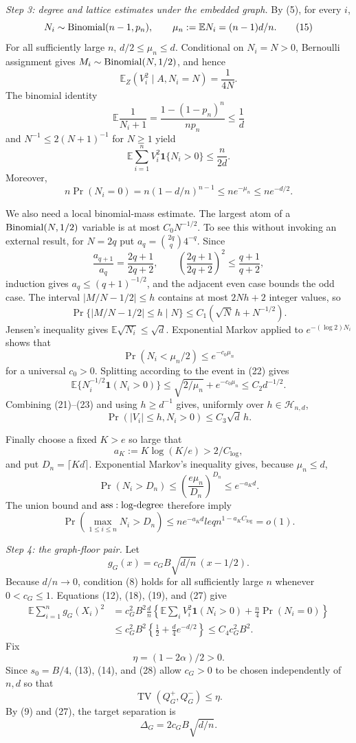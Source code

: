 \textit{Step 3: degree and lattice estimates under the embedded graph.}
By (5), for every \(i\),
\[
 N_i\sim{\rm Binomial}(n-1,p_n),
 \qquad
 \mu_n:=\mathbb EN_i=(n-1)d/n.
\tag{15}
\]
For all sufficiently large \(n\), \(d/2\leq\mu_n\leq d\).  Conditional on \(N_i=N>0\), Bernoulli assignment gives \(M_i\sim{\rm Binomial}(N,1/2)\), and hence
\[
 \mathbb E_Z(V_i^2\mid A,N_i=N)=\frac1{4N}.
\tag{16}
\]
The binomial identity
\[
 \mathbb E\frac1{N_i+1}
 =\frac{1-(1-p_n)^n}{np_n}\leq\frac1d
\tag{17}
\]
and \(N^{-1}\leq2(N+1)^{-1}\) for \(N\geq1\) yield
\[
 \mathbb E\sum_{i=1}^nV_i^2\mathbf1\{N_i>0\}
 \leq\frac{n}{2d}.
\tag{18}
\]
Moreover,
\[
 n\Pr(N_i=0)=n(1-d/n)^{n-1}
 \leq ne^{-\mu_n}\leq ne^{-d/2}.
\tag{19}
\]

We also need a local binomial-mass estimate.  The largest atom of a \({\rm Binomial}(N,1/2)\) variable is at most \(C_0N^{-1/2}\).  To see this without invoking an external result, for \(N=2q\) put \(a_q={2q\choose q}4^{-q}\).  Since
\[
 \frac{a_{q+1}}{a_q}=\frac{2q+1}{2q+2},
 \qquad
 \left(\frac{2q+1}{2q+2}\right)^2\leq\frac{q+1}{q+2},
\tag{20}
\]
induction gives \(a_q\leq(q+1)^{-1/2}\), and the adjacent even case bounds the odd case.  The interval \(|M/N-1/2|\leq h\) contains at most \(2Nh+2\) integer values, so
\[
 \Pr\{|M/N-1/2|\leq h\mid N\}
 \leq C_1(\sqrt N\,h+N^{-1/2}).
\tag{21}
\]
Jensen's inequality gives \(\mathbb E\sqrt{N_i}\leq\sqrt d\).  Exponential Markov applied to \(e^{-(\log2)N_i}\) shows that
\[
 \Pr(N_i<\mu_n/2)\leq e^{-c_0\mu_n}
\tag{22}
\]
for a universal \(c_0>0\).  Splitting according to the event in (22) gives
\[
 \mathbb E\{N_i^{-1/2}\mathbf1(N_i>0)\}
 \leq\sqrt{2/\mu_n}+e^{-c_0\mu_n}
 \leq C_2d^{-1/2}.
\tag{23}
\]
Combining (21)--(23) and using \(h\geq d^{-1}\) gives, uniformly over \(h\in\mathcal H_{n,d}\),
\[
 \Pr(|V_i|\leq h,N_i>0)\leq C_3\sqrt d\,h.
\tag{24}
\]

Finally choose a fixed \(K>e\) so large that
\[
 a_K:=K\log(K/e)>2/C_{\log},
\]
and put \(D_n=\lceil Kd\rceil\).  Exponential Markov's inequality gives, because \(\mu_n\leq d\),
\[
 \Pr(N_i>D_n)
 \leq\left(\frac{e\mu_n}{D_n}\right)^{D_n}
 \leq e^{-a_Kd}.
\tag{25}
\]
The union bound and \({\rm ass:log\text{-}degree}\) therefore imply
\[
 \Pr\left(\max_{1\leq i\leq n}N_i>D_n\right)
 \leq ne^{-a_Kd}leq n^{1-a_KC_{\log}}=o(1).
\tag{26}
\]

\textit{Step 4: the graph-floor pair.}
Let
\[
 g_G(x)=c_GB\sqrt{d/n}\,(x-1/2).
\tag{27}
\]
Because \(d/n\to0\), condition (8) holds for all sufficiently large \(n\) whenever \(0<c_G\leq1\).  Equations (12), (18), (19), and (27) give
\[
 \begin{aligned}
 \mathbb E\sum_{i=1}^ng_G(X_i)^2
 &=c_G^2B^2\frac dn
 \left\{\mathbb E\sum_iV_i^2\mathbf1(N_i>0)
       +\frac n4\Pr(N_i=0)\right\}\\
 &\leq c_G^2B^2\left\{\frac12+\frac d4e^{-d/2}\right\}
 \leq C_4c_G^2B^2.
\end{aligned}
\tag{28}
\]
Fix
\[
 \eta=(1-2\alpha)/2>0.
\tag{29}
\]
Since \(s_0=B/4\), (13), (14), and (28) allow \(c_G>0\) to be chosen independently of \(n,d\) so that
\[
 \operatorname{TV}(Q_G^+,Q_G^-)\leq\eta.
\tag{30}
\]
By (9) and (27), the target separation is
\[
 \Delta_G=2c_GB\sqrt{d/n}.
\tag{31}
\]

